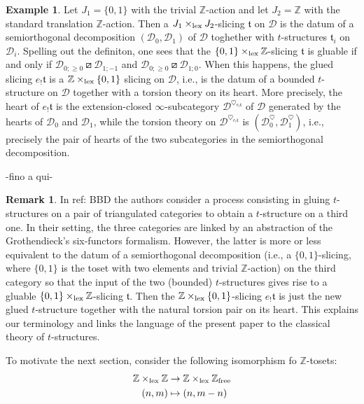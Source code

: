 \documentclass{article}
\theoremstyle{definition}
\newtheorem{exmp}[thm]{Example}
\newtheorem{rem}[thm]{Remark}
\newcommand{\Z}{\mathbb{Z}}
\newcommand{\tee}{\mathfrak{t}}
\newcommand{\orth}{\boxslash}
\newcommand{\lex}{\times_{\textnormal{lex}}}
\begin{document}
\begin{exmp} Let $J_1=\{0,1\}$ with the trivial $\Z$-action and let $J_2=\Z$ with the standard translation $\Z$-action.  Then a $J_1\lex J_2$-slicing $\tee$ on $\mathscr{D}$ is the datum of a semiorthogonal decomposition $(\mathscr{D}_0,\mathscr{D}_1)$ of $\mathscr{D}$ toghether with $t$-structures $\tee_i$ on $\mathscr{D}_i$. Spelling out the definiton, one sees that the $\{0,1\}\lex \Z$-slicing $\tee$ is gluable if and only if 
$\mathscr{D}_{0;\geq 0}\orth \mathscr{D}_{1;-1}$ and $\mathscr{D}_{0;\geq 0}\orth \mathscr{D}_{1;0}$. When this happens, the glued slicing $e_!\tee$ is a $\Z\lex\{0,1\}$ slicing on $\mathscr{D}$, i.e., is the datum of a bounded $t$-structure on $\mathscr{D}$ together with a torsion theory on its heart. More precisely, the heart of $e_!\tee$ is the extension-closed $\infty$-subcategory $\mathscr{D}^{\heartsuit_{e_!\tee}}$ of $\mathscr{D}$ generated by the hearts of $\mathscr{D}_0$ and $\mathscr{D}_1$, while the torsion theory on $\mathscr{D}^{\heartsuit_{e_!\tee}}$ is
$(\mathscr{D}_0^{\heartsuit},\mathscr{D}_1^{\heartsuit})$, i.e., precisely the pair of hearts of the two subcategories in the semiorthogonal decomposition.
\end{exmp}


{\Huge -fino a qui-}


\begin{rem}
  In {\color{red}ref: BBD} the authors consider a process consisting in gluing $t$-structures on a pair of triangulated categories to obtain a $t$-structure on a third one. In their setting, the three categories are linked by an abstraction of the Grothendieck's six-functors formalism. However, the latter is more or less equivalent to the datum of a semiorthogonal decomposition (i.e., a $\{0,1 \}$-slicing, where $\{0,1 \}$ is the toset with two elements and trivial $\Z$-action) on the third category so that the input of the two (bounded) $t$-structures gives rise to a gluable $\{0,1\} \lex \Z$-slicing $\tee$. Then the $\Z \lex \{0,1 \}$-slicing $e_! \tee$ is just the new glued $t$-structure together with the natural torsion pair on its heart. This explains our terminology and links the language of the present paper to the classical theory of $t$-structures. 
\end{rem}

To motivate the next section, consider the following isomorphism fo $\Z$-tosets:
  \begin{align*}
     \Z \lex \Z &\to \Z \lex \Z_{\textnormal{free}} \\
   (n,m) & \mapsto (n,m-n)  
  \end{align*}
\end{document}
